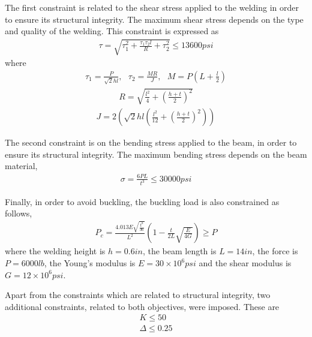 The first constraint is related to the shear stress applied to the welding in order to ensure its structural integrity. The maximum shear stress depends on the type and quality of the welding.  This constraint is expressed as 
\begin{eqnarray}
   \tau = \sqrt{\tau_1^2 + \frac{\tau_1 \tau_2 l}{R} +\tau_2^2} \leq 13600 psi
\label{shear}
\end{eqnarray}
where
\begin{eqnarray}
   \nonumber \tau_1 = \frac{P}{\sqrt{2}hl}, ~~~\tau_2 = \frac{MR}{J}, ~~~M = P(L+\frac{l}{2}) 
\end{eqnarray}
\begin{eqnarray}
   \nonumber R = \sqrt{\frac{l^2}{4} + (\frac{h+t}{2})^2} 
\end{eqnarray}
\begin{eqnarray}
   \nonumber J = 2\left( \sqrt{2}hl\left( \frac{l^2}{12} + \left(\frac{h+t}{2}\right)^2 \right) \right)
\end{eqnarray}

The second constraint is on the bending stress applied to the beam, in order to ensure its structural integrity. The maximum bending stress depends on the beam material,
\begin{eqnarray}
   \sigma = \frac{6PL}{t^3} \leq 30000 psi
   \label{bend} 
\end{eqnarray}

Finally, in order to avoid buckling, the buckling load is also constrained as follows,  
\begin{eqnarray}
   P_c = \frac{4.013E\sqrt{\frac{t^8}{36}}}{L^2}\left( 1- \frac{t}{2L}\sqrt{\frac{E}{4G}} \right) \geq P 
   \label{back} 
\end{eqnarray}
where the welding height is $h \! = \!0.6 in$, the beam length is $L \! =\! 14 in$, the force is $P\! =\! 6000 lb$, the Young’s modulus is $E \!=\! 30 \! \times \! 10^6 psi$ and the shear modulus is $G\! = \!12 \! \times \! 10^6 psi$.  

Apart from the constraints which are related to structural integrity, two additional constraints, related to both objectives, were imposed. These are 
\begin{eqnarray}
   K \leq 50 \\
   \Delta \leq 0.25 
   \label{obj} 
\end{eqnarray}


